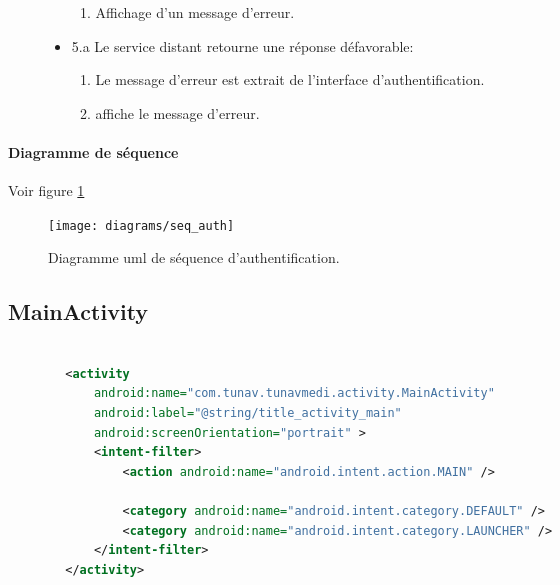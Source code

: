 \begin{description}
\begin{itemize}
\begin{enumerate}

\item Affichage d'un message d'erreur.

\end{enumerate}

\item 5.a Le service distant retourne une réponse défavorable:

\begin{enumerate}

\item Le message d'erreur est extrait de l'interface d'authentification.

\item {} affiche le message d'erreur.

\end{enumerate}

\end{itemize}

\end{description}

\paragraph{Diagramme de séquence}

Voir figure \ref{fig:seq_auth}

\begin{figure}
\center
\texttt{[image: diagrams/seq\_auth]}
\caption{Diagramme \gls{uml} de séquence d'authentification.}
\label{fig:seq_auth}
\end{figure}



\subsection{MainActivity}

\begin{lstlisting}[language=xml, caption=Déclaration dans AndroidManifest de MainActivity]

        <activity
            android:name="com.tunav.tunavmedi.activity.MainActivity"
            android:label="@string/title_activity_main"
            android:screenOrientation="portrait" >
            <intent-filter>
                <action android:name="android.intent.action.MAIN" />

                <category android:name="android.intent.category.DEFAULT" />
                <category android:name="android.intent.category.LAUNCHER" />
            </intent-filter>
        </activity>

\end{lstlisting}

